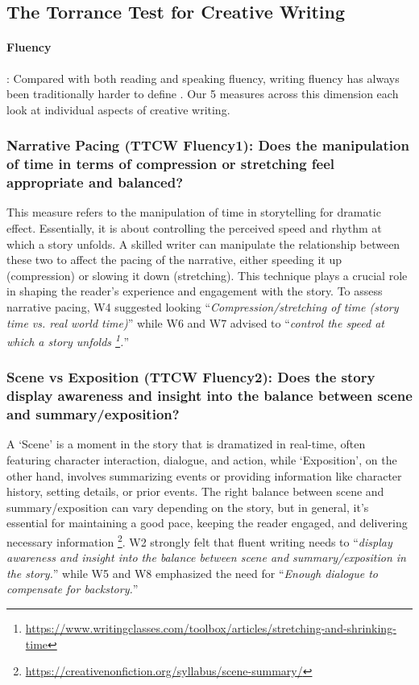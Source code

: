 \subsection{The Torrance Test for Creative Writing} \label{CreativityTest}

\paragraph{\textbf{{Fluency}}}: Compared with both reading and speaking fluency, writing fluency has always been traditionally harder to define \cite{abdel2013we}. Our 5 measures across this dimension each look at individual aspects of creative writing. 

\subsubsection{\textbf{{\color{blue} Narrative Pacing (TTCW Fluency1)}: Does the manipulation of time in terms of compression or stretching feel appropriate and balanced?}}This measure refers to the manipulation of time in storytelling for dramatic effect. Essentially, it is about controlling the perceived speed and rhythm at which a story unfolds. A skilled writer can manipulate the relationship between these two to affect the pacing of the narrative, either speeding it up (compression) or slowing it down (stretching). This technique plays a crucial role in shaping the reader's experience and engagement with the story. To assess narrative pacing, W4 suggested looking  ``\textit{Compression/stretching of time (story time vs. real world time)}'' while W6 and W7 advised to ``\textit{control the speed at which a story unfolds
\footnote{\url{https://www.writingclasses.com/toolbox/articles/stretching-and-shrinking-time}}.}''

\subsubsection{\textbf{{\color{blue}Scene vs Exposition (TTCW Fluency2)}: Does the story display awareness and insight into the balance between scene and summary/exposition?}} A `Scene' is a moment in the story that is dramatized in real-time, often featuring character interaction, dialogue, and action, while `Exposition', on the other hand, involves summarizing events or providing information like character history, setting details, or prior events. The right balance between scene and summary/exposition can vary depending on the story, but in general, it's essential for maintaining a good pace, keeping the reader engaged, and delivering necessary information \citet{burroway2019writing} 
\footnote{\url{https://creativenonfiction.org/syllabus/scene-summary/}}.
W2 strongly felt that fluent writing needs to ``\textit{display awareness and insight into the balance between scene and summary/exposition in the story.}'' while W5 and W8 emphasized the need for ``\textit{Enough dialogue to compensate for backstory.}''

